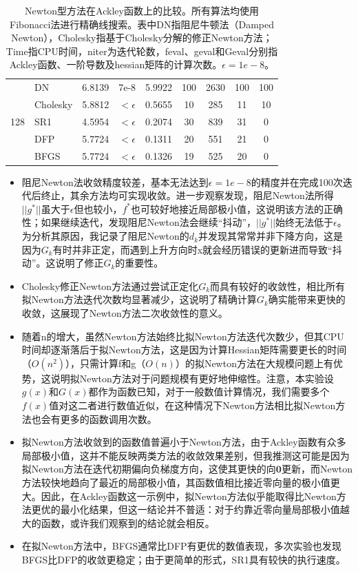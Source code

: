 \documentclass{article}
\begin{document}
\begin{table}[h]
\begin{tabular}{c l c c c c c c c}
    \cmidrule(lr){1-9}
    \multirow{5}{*}{128} &
    DN & 6.8139 & 7e-8 & 5.9922 & 100 & 2630 & 100 & 100 \\
    & Cholesky & 5.8812 & $<\epsilon$ & 0.5655 & 10 & 285 & 11 & 10 \\
    & SR1 & 4.5954 & $<\epsilon$ & 0.2074 & 30 & 839 & 31 & 0 \\
    & DFP & 5.7724 & $<\epsilon$ & 0.1311 & 20 & 551 & 21 & 0 \\
    & BFGS & 5.7724 & $<\epsilon$ & 0.1326 & 19 & 525 & 20 & 0 \\
    \bottomrule
  \end{tabular}
  \caption{Newton型方法在Ackley函数上的比较。所有算法均使用Fibonacci法进行精确线搜索。表中DN指阻尼牛顿法（Damped Newton），Cholesky指基于Cholesky分解的修正Newton方法；Time指CPU时间，niter为迭代轮数，feval、geval和Geval分别指Ackley函数、一阶导数及hessian矩阵的计算次数。$\epsilon=1e-8$。}
  \label{tab:overall}
\end{table}

\begin{itemize}
  \item 阻尼Newton法收敛精度较差，基本无法达到$\epsilon=1e-8$的精度并在完成100次迭代后终止，其余方法均可实现收敛。进一步观察发现，阻尼Newton法所得$||g^*||$虽大于$\epsilon$但也较小，$f^*$也可较好地接近局部极小值，这说明该方法的正确性；如果继续迭代，发现阻尼Newton法会继续“抖动”，$||g^*||$始终无法低于$\epsilon$。为分析其原因，我记录了阻尼Newton的$d_k$并发现其常常并非下降方向，这是因为$G_k$有时并非正定，而遇到上升方向时x就会经历错误的更新进而导致“抖动”。这说明了修正$G_k$的重要性。
  \item Cholesky修正Newton方法通过尝试正定化$G_k$而具有较好的收敛性，相比所有拟Newton方法迭代次数均显著减少，这说明了精确计算$G_k$确实能带来更快的收敛，这展现了Newton方法二次收敛性的意义。
  \item 随着n的增大，虽然Newton方法始终比拟Newton方法迭代次数少，但其CPU时间却逐渐落后于拟Newton方法，这是因为计算Hessian矩阵需要更长的时间（$O(n^2)$），只需计算f和g（$O(n)$）的拟Newton方法在大规模问题上有优势，这说明拟Newton方法对于问题规模有更好地伸缩性。注意，本实验设$g(x)$和$G(x)$都作为函数已知，对于一般数值计算情况，我们需要多个$f(x)$值对这二者进行数值近似，在这种情况下Newton方法相比拟Newton方法也会有更多的函数调用次数。
  \item 拟Newton方法收敛到的函数值普遍小于Newton方法，由于Ackley函数有众多局部极小值，这并不能反映两类方法的收敛效果差别，但我推测这可能是因为拟Newton方法在迭代初期偏向负梯度方向，这使其更快的向$\mathbf{0}$更新，而Newton方法较快地趋向了最近的局部极小值，其函数值相比接近零向量的极小值更大。因此，在Ackley函数这一示例中，拟Newton方法似乎能取得比Newton方法更优的最小化结果，但这一结论并不普适：对于约靠近零向量局部极小值越大的函数，或许我们观察到的结论就会相反。
  \item 在拟Newton方法中，BFGS通常比DFP有更优的数值表现，多次实验也发现BFGS比DFP的收敛更稳定；由于更简单的形式，SR1具有较快的执行速度。
\end{itemize}
\end{document}
